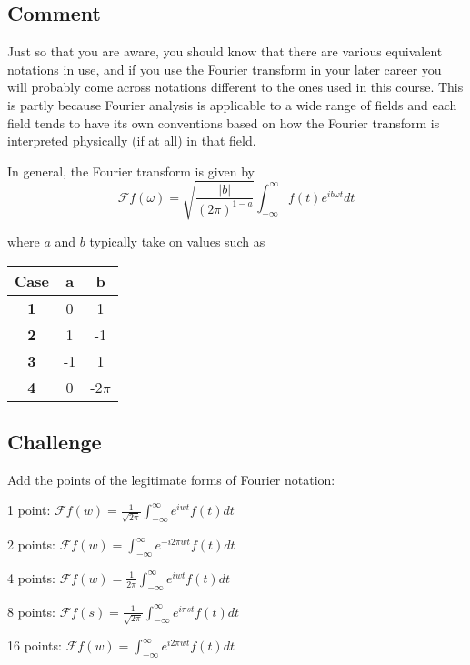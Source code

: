 \subsection*{Comment}
Just so that you are aware, you should know that there are various equivalent notations in use, and if you use the Fourier transform in your later career you will probably come across notations different to the ones used in this course. This is partly because Fourier analysis is applicable to a wide range of fields and each field tends to have its own conventions based on how the Fourier transform is interpreted physically (if at all) in that field.

In general, the Fourier transform is given by
\begin{equation}
    \mathcal{F}f(\omega) = \sqrt{\frac{|b|}{(2 \pi)^{1-a}}} \int_{-\infty}^{\infty} f(t) e^{i b \omega t} dt
\end{equation}

where $a$ and $b$ typically take on values such as 

\begin{tabular}{|c|c c|}
    \hline
    \textbf{Case} & \textbf{a} & \textbf{b} \\
    \hline
    \textbf{1}    & 0          & 1          \\
    \textbf{2}    & 1          & -1         \\
    \textbf{3}    & -1         & 1          \\
    \textbf{4}    & 0          & -2$\pi$   \\
    \hline
\end{tabular}

\subsection*{Challenge}
Add the points of the legitimate forms of Fourier notation:

1 point: $\displaystyle \mathcal{F}f(w)=\frac{1}{\sqrt{2 \pi}} \int_{-\infty}^{\infty} e^{i w t} f(t) dt$

2 points: $\displaystyle \mathcal{F}f(w)=\int_{-\infty}^{\infty} e^{-i 2 \pi w t} f(t) dt$

4 points: $\displaystyle \mathcal{F}f(w)=\frac{1}{2 \pi} \int_{-\infty}^{\infty} e^{i w t} f(t) dt$

8 points: $\displaystyle \mathcal{F}f(s)=\frac{1}{\sqrt{2 \pi}} \int_{-\infty}^{\infty} e^{i \pi s t} f(t) dt$

16 points: $\displaystyle \mathcal{F}f(w)=\int_{-\infty}^{\infty} e^{i 2 \pi w t} f(t) dt$

